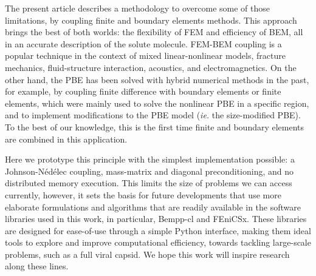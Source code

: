 The present article describes a methodology to overcome some of those limitations, by coupling finite and boundary elements methods.
This approach brings the best of both worlds: the flexibility of FEM and efficiency of BEM, all in an accurate description of the solute molecule.
FEM-BEM coupling is a popular technique in the context of mixed linear-nonlinear models,\cite{carstensen1995coupling,aurada2013classical} fracture mechanics,\cite{aour2007coupled} fluid-structure interaction,\cite{estorff1991fem} acoustics,\cite{hiptmair2006stabilized} and electromagnetics.\cite{matsuoka1988calculation,hiptmair2008stabilized,bruckner20123d}
On the other hand, the PBE has been solved with hybrid numerical methods in the past, for example, by coupling finite difference with boundary elements\cite{boschitsch2004hybrid} or finite elements,\cite{xie2016new,ying2018hybrid} which were mainly used to solve the nonlinear PBE in a specific region, and to implement modifications to the PBE model ({\it ie.} the size-modified PBE).
To the best of our knowledge, this is the first time finite and boundary elements are combined in this application.

Here we prototype this principle with the simplest implementation possible: a Johnson-N\'ed\'elec\cite{johnson1980coupling} coupling, mass-matrix and diagonal preconditioning, and no distributed memory execution. 
This limits the size of problems we can access currently, however, it sets the basis for future developments that use more elaborate formulations and algorithms that are readily available in the software libraries used in this work, in particular, Bempp-cl and FEniCSx.
These libraries are designed for ease-of-use through a simple Python interface, making them ideal tools to explore and improve computational efficiency, towards tackling large-scale problems, such as a full viral capsid.\cite{MartinezETal2019,wang2021high}
We hope this work will inspire research along these lines.
